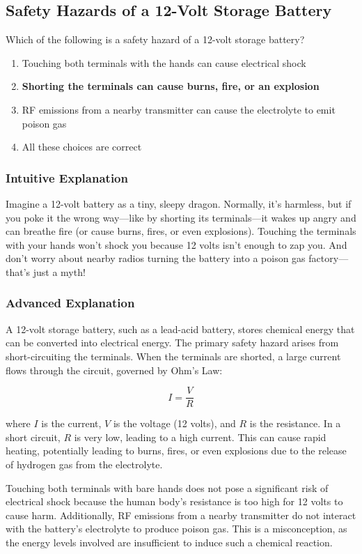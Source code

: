 \subsection{Safety Hazards of a 12-Volt Storage Battery}
\label{T0A01}

\begin{tcolorbox}[colback=gray!10!white,colframe=black!75!black,title=T0A01]
Which of the following is a safety hazard of a 12-volt storage battery?
\begin{enumerate}[label=\Alph*]
    \item Touching both terminals with the hands can cause electrical shock
    \item \textbf{Shorting the terminals can cause burns, fire, or an explosion}
    \item RF emissions from a nearby transmitter can cause the electrolyte to emit poison gas
    \item All these choices are correct
\end{enumerate}
\end{tcolorbox}

\subsubsection{Intuitive Explanation}
Imagine a 12-volt battery as a tiny, sleepy dragon. Normally, it’s harmless, but if you poke it the wrong way—like by shorting its terminals—it wakes up angry and can breathe fire (or cause burns, fires, or even explosions). Touching the terminals with your hands won’t shock you because 12 volts isn’t enough to zap you. And don’t worry about nearby radios turning the battery into a poison gas factory—that’s just a myth!

\subsubsection{Advanced Explanation}
A 12-volt storage battery, such as a lead-acid battery, stores chemical energy that can be converted into electrical energy. The primary safety hazard arises from short-circuiting the terminals. When the terminals are shorted, a large current flows through the circuit, governed by Ohm's Law:

\[
I = \frac{V}{R}
\]

where \( I \) is the current, \( V \) is the voltage (12 volts), and \( R \) is the resistance. In a short circuit, \( R \) is very low, leading to a high current. This can cause rapid heating, potentially leading to burns, fires, or even explosions due to the release of hydrogen gas from the electrolyte. 

Touching both terminals with bare hands does not pose a significant risk of electrical shock because the human body's resistance is too high for 12 volts to cause harm. Additionally, RF emissions from a nearby transmitter do not interact with the battery's electrolyte to produce poison gas. This is a misconception, as the energy levels involved are insufficient to induce such a chemical reaction.

